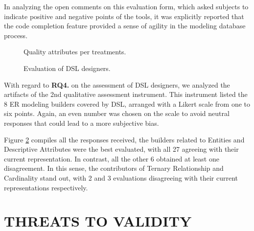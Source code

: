 \documentclass[a4paper,twoside,anonymous]{article}
\begin{document}
In analyzing the open comments on this evaluation form, which asked subjects to indicate positive and negative points of the tools, it was explicitly reported that the code completion feature provided a sense of agility in the modeling database process.

\begin{figure}[!htb]
    \centering
    
    \caption{Quality attributes per treatments.}
    \label{fig:inst3GERALExp}
\end{figure}

\begin{figure}[!htb]
    \centering
    
    \caption{Evaluation of DSL designers.}
    \label{fig:inst4GERALExp}
\end{figure}

With regard to \textbf{RQ4.} on the assessment of DSL designers, we analyzed the artifacts of the 2nd qualitative assessment instrument.
This instrument listed the 8 ER modeling builders covered by DSL, arranged with a Likert scale from one to six points.
Again, an even number was chosen on the scale to avoid neutral responses that could lead to a more subjective bias.

Figure \ref{fig:inst4GERALExp} compiles all the responses received, the builders related to Entities and Descriptive Attributes were the best evaluated, with all 27 agreeing with their current representation.
In contrast, all the other 6 obtained at least one disagreement.
In this sense, the contributors of Ternary Relationship and Cardinality stand out, with 2 and 3 evaluations disagreeing with their current representations respectively.

\section{\uppercase{Threats to validity}}
\label{sec:threats}

\end{document}
